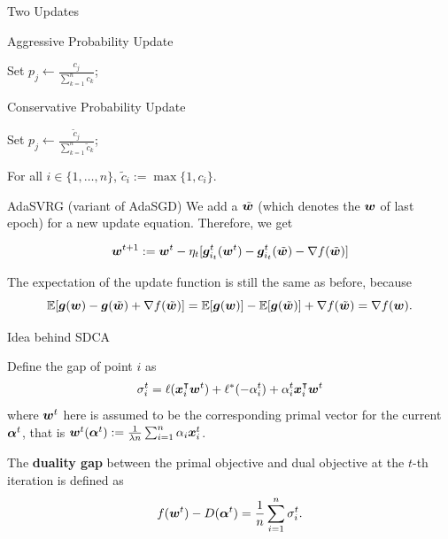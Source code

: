 \begin{frame}{Two Updates}
\begin{algorithm}[H]
    \label{alg:AggUpdate}
    \caption{Aggressive Probability Update}
    \SetAlgoLined
     {
	Set $p_j \leftarrow \frac{c_j}{\sum_{k=1}^n c_k}$;
    }
    \end{algorithm}
\begin{algorithm}[H]    
    \label{alg:ConUpdate}
    \caption{Conservative Probability Update}
    \SetAlgoLined
     {
	Set $p_j \leftarrow \frac{\tilde{c}_j}{\sum_{k=1}^n \tilde{c}_k}$;
    }
\end{algorithm} 
For all $i\in\{1,\dots,n\}$, $\tilde{c}_i := \max\{1, c_i\}$.
\end{frame}

\begin{frame}{AdaSVRG (variant of AdaSGD)}
We add a $\tilde{\bm{w}}$ (which denotes the $\bm{w}$ of last epoch) for a new update equation. Therefore, we get

\begin{equation*}\label{eq:vr_w_update}
    \bm{w}^{t+1} := \bm{w}^{t}-\eta_t [\bm{g}_{i_t}^t(\bm{w}^{t}) - \bm{g}_{i_t}^t(\tilde{\bm{w}}) - \nabla f(\tilde{\bm{w}})]
\end{equation*}

The expectation of the update function is still the same as before, because
\[
    \mathbb{E}[\bm{g}(\bm{w}) - \bm{g}(\tilde{\bm{w}}) + \nabla f(\tilde{\bm{w}})] = \mathbb{E}[\bm{g}(\bm{w})] - \mathbb{E}[\bm{g}(\tilde{\bm{w}})] + \nabla f(\tilde{\bm{w}}) = \nabla f(\bm{w}).
\]
\end{frame}

\begin{frame}{Idea behind SDCA}
\begin{definition}{Define the gap of point $i$ as} 
\[
\sigma_i^t =  \ell(\bm{x}_i^\intercal\bm{w}^{t})+\ell^*(-\alpha_i^{t})+\alpha_i^{t}\bm{x}_i^\intercal\bm{w}^{t} 
\]
where $\bm{w}^t$ here is assumed to be the corresponding primal vector for the current $\bm{\alpha}^t$, that is $\bm{w}^t(\bm{\alpha}^t) := \frac{1}{\lambda n}\sum_{i=1}^n \alpha_i \bm{x}_i^t$.
\end{definition}

The \textbf{duality gap} between the primal objective and dual objective at the $t$-th iteration is defined as
\[
    f(\bm{w}^{t})-D(\bm{\alpha}^{t}) = \frac{1}{n} \sum_{i=1}^n \sigma_i^t.
\]
\end{frame}

